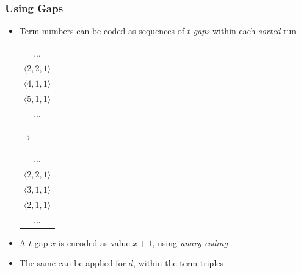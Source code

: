 \documentclass[svgnames]{beamer}
\begin{document}
\begin{frame}
    \frametitle{Using Gaps}

    \begin{block}{}
        \begin{itemize}
        \item Term numbers can be coded as sequences of \emph{$t$-gaps} within each
            \emph{sorted} run
            \begin{center}
                \small
                \begin{tabular}{|c|}
                    ... \\
                    $\langle 2,2,1 \rangle$ \\
                    $\langle 4,1,1 \rangle$ \\
                    $\langle 5,1,1 \rangle$ \\
                    ... \\
                \end{tabular}   
                {\large $\rightarrow$}
                \begin{tabular}{|c|}
                    ... \\
                    $\langle 2,2,1 \rangle$ \\
                    $\langle 3,1,1 \rangle$ \\
                    $\langle 2,1,1 \rangle$ \\
                    ... \\
                \end{tabular}
            \end{center}
        \item A $t$-gap $x$ is encoded as value $x+1$, using \emph{unary coding}
        \item The same can be applied for $d$, within the term triples
        \end{itemize}
    \end{block}
\end{frame}

\end{document}

